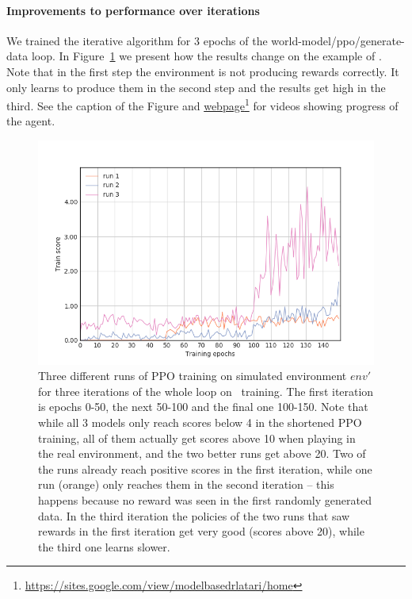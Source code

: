 \paragraph{Improvements to performance over iterations}

We trained the iterative algorithm for 3 epochs of
the world-model/ppo/generate-data loop. In Figure~\ref{fig:freeway_three_epochs} we present
how the results change on the example of \freeway. Note that in the first step the environment is not producing rewards
correctly. It only learns to produce them in the second step and the results get high in the third. See the caption of the Figure and
\href{https://sites.google.com/view/modelbasedrlatari/home}{webpage}\footnote{\url{https://sites.google.com/view/modelbasedrlatari/home}} for 
videos showing progress of the agent. %

\begin{figure}[H]
\centering
\includegraphics[width=0.9\columnwidth]{figures/freeway.png}
\caption{Three different runs of PPO training on simulated environment $env'$ for three iterations of the whole loop on \freeway\ training.
  The first iteration is epochs 0-50, the next 50-100 and the final one 100-150. Note that while all 3 models only reach scores below 4 in
  the shortened PPO training, all of them actually get scores above 10 when playing in the real environment, and the two better runs get above 20.
  Two of the runs already reach positive scores in the first iteration, while one run (orange) only reaches them in the second iteration -- this
  happens because no reward was seen in the first randomly generated data. In the third iteration the policies of the two runs that saw rewards
  in the first iteration get very good (scores above 20), while the third one learns slower.}
\label{fig:freeway_three_epochs}
\end{figure}

